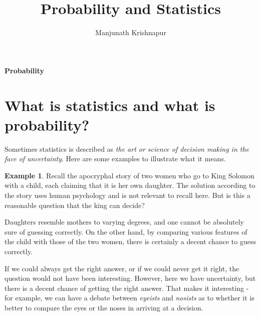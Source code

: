 \documentclass[preprint,  11pt]{amsart}
\theoremstyle{plain} %
\theoremstyle{definition} %
\newtheorem{example}[theorem]{Example}
\begin{document}
\title{Probability and Statistics}
\author{Manjunath Krishnapur}

\maketitle

 \tableofcontents

\newpage

\maketitle

\setcounter{page}{4}



\newpage
\vspace*{\fill}
\begin{center}
\Huge {\bf Probability}
\end{center}
\vspace*{\fill}
\newpage

\section{What is statistics and what is probability?}
Sometimes statistics is described as {\em the art or science of decision making in the face of uncertainty}.  Here are some examples to illustrate what it means.
\begin{example} Recall the apocryphal story of two women who go to King Solomon with a child, each claiming that it is her own daughter. The solution according to the story uses human psychology and is not relevant to recall here. But is this a reasonable question that the king can decide?

Daughters resemble mothers to varying degrees, and one cannot be absolutely sure of guessing correctly.
 On the other hand, by comparing various features of the child with those of the two women, there is certainly a decent chance to guess correctly.

  If we could always get the right answer, or if we could never get it right, the question would not have been interesting. However, here we have uncertainty, but there is a decent chance of getting the right answer. That makes it interesting - for example, we can have a debate between {\em eyeists}  and {\em nosists} as to whether it is better to compare the eyes or the noses in arriving at a decision.
\end{example}
\end{document}
